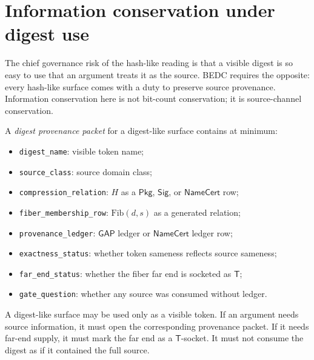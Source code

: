 \section{Information conservation under digest use}
\label{sec:hash-like-information-conservation}

The chief governance risk of the hash-like reading is that a visible digest is so easy to use that an argument treats it as the source. BEDC requires the opposite: every hash-like surface comes with a duty to preserve source provenance. Information conservation here is not bit-count conservation; it is source-channel conservation.

\begin{definition}
\label{def:hash-like-digest-provenance-packet}
A \emph{digest provenance packet} for a digest-like surface contains at minimum:
\begin{itemize}
\item \texttt{digest\_name}: visible token name;
\item \texttt{source\_class}: source domain class;
\item \texttt{compression\_relation}: $H$ as a $\mathsf{Pkg}$, $\mathsf{Sig}$, or $\mathsf{NameCert}$ row;
\item \texttt{fiber\_membership\_row}: $\mathrm{Fib}(d, s)$ as a generated relation;
\item \texttt{provenance\_ledger}: $\mathsf{GAP}$ ledger or $\mathsf{NameCert}$ ledger row;
\item \texttt{exactness\_status}: whether token sameness reflects source sameness;
\item \texttt{far\_end\_status}: whether the fiber far end is socketed as $\mathsf{T}$;
\item \texttt{gate\_question}: whether any source was consumed without ledger.
\end{itemize}
\end{definition}

\begin{principle}
\label{prin:hash-like-no-hidden-source-consumption}
A digest-like surface may be used only as a visible token. If an argument needs source information, it must open the corresponding provenance packet. If it needs far-end supply, it must mark the far end as a $\mathsf{T}$-socket. It must not consume the digest as if it contained the full source.
\end{principle}

